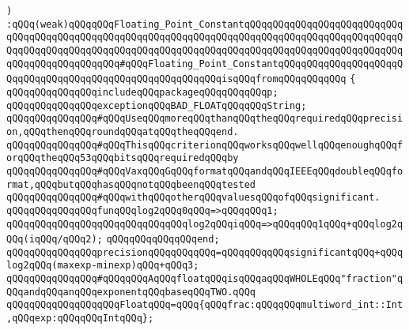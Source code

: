 \verb|)|\newline
\newline
\verb|:qQQq(weak)qQQqqQQqFloating_Point_ConstantqQQqqQQqqQQqqQQqqQQqqQQqqQQqqQQqqQQqqQQqqQQqqQQqqQQqqQQqqQQqqQQqqQQqqQQqqQQqqQQqqQQqqQQqqQQqqQQqqQQqqQQqqQQqqQQqqQQqqQQqqQQqqQQqqQQqqQQqqQQqqQQqqQQqqQQqqQQqqQQqqQQqqQQqqQQqqQQqqQQqqQQqqQQq#qQQqFloating_Point_ConstantqQQqqQQqqQQqqQQqqQQqqQQqqQQqqQQqqQQqqQQqqQQqqQQqqQQqqQQqqQQqisqQQqfromqQQqqQQqqQQq|\newline
\newline
\verb|{|\newline
\verb|qQQqqQQqqQQqqQQqincludeqQQqpackageqQQqqQQqqQQqp;|\newline
\newline
\verb|qQQqqQQqqQQqqQQqexceptionqQQqBAD_FLOATqQQqqQQqString;|\newline
\newline
\verb|qQQqqQQqqQQqqQQq#qQQqUseqQQqmoreqQQqthanqQQqtheqQQqrequiredqQQqprecision,qQQqthenqQQqroundqQQqatqQQqtheqQQqend.|\newline
\verb|qQQqqQQqqQQqqQQq#qQQqThisqQQqcriterionqQQqworksqQQqwellqQQqenoughqQQqforqQQqtheqQQq53qQQqbitsqQQqrequiredqQQqby|\newline
\verb|qQQqqQQqqQQqqQQq#qQQqVaxqQQqGqQQqformatqQQqandqQQqIEEEqQQqdoubleqQQqformat,qQQqbutqQQqhasqQQqnotqQQqbeenqQQqtested|\newline
\verb|qQQqqQQqqQQqqQQq#qQQqwithqQQqotherqQQqvaluesqQQqofqQQqsignificant.|\newline
\newline
\verb|qQQqqQQqqQQqqQQqfunqQQqlog2qQQq0qQQq=>qQQqqQQq1;|\newline
\verb|qQQqqQQqqQQqqQQqqQQqqQQqqQQqqQQqlog2qQQqiqQQq=>qQQqqQQq1qQQq+qQQqlog2qQQq(iqQQq/qQQq2);|\newline
\verb|qQQqqQQqqQQqqQQqend;|\newline
\newline
\verb|qQQqqQQqqQQqqQQqprecisionqQQqqQQqqQQq=qQQqqQQqqQQqsignificantqQQq+qQQqlog2qQQq(maxexp-minexp)qQQq+qQQq3;|\newline
\newline
\verb|qQQqqQQqqQQqqQQq#qQQqqQQqAqQQqfloatqQQqisqQQqaqQQqWHOLEqQQq"fraction"qQQqandqQQqanqQQqexponentqQQqbaseqQQqTWO.qQQq|\newline
\verb|qQQqqQQqqQQqqQQqqQQqFloatqQQq=qQQq{qQQqfrac:qQQqqQQqmultiword_int::Int,qQQqexp:qQQqqQQqIntqQQq};|\newline
